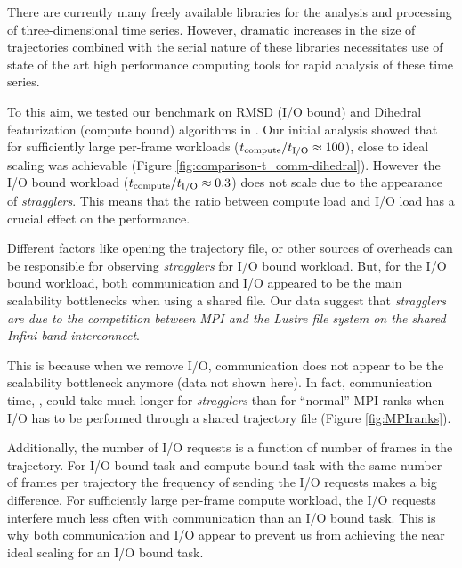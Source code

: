\label{concl} 
There are currently many freely available libraries for the analysis and processing of three-dimensional time series.
However, dramatic increases in the size of trajectories combined with the serial nature of these libraries necessitates 
use of state of the art high performance computing tools for rapid analysis of these time series. 

To this aim, we tested our benchmark on RMSD (I/O bound) and Dihedral featurization (compute bound) algorithms in .
Our initial analysis showed that for sufficiently large per-frame workloads (${t}_{\text{compute}}/{t}_{\text{I/O}} \approx 100$), close to ideal scaling was achievable (Figure \ref{fig:comparison-t_comm-dihedral}).
However the I/O bound workload (${t}_{\text{compute}}/{t}_{\text{I/O}} \approx 0.3$) does not scale due to the appearance of \emph{stragglers}. 
This means that the ratio between compute load and I/O load has a crucial effect on the performance. 

Different factors like opening the trajectory file, or other sources of overheads can be responsible for observing \emph{stragglers} for I/O bound workload.
But, for the I/O bound workload, both communication and I/O appeared to be the main scalability bottlenecks when using a shared file.
Our data suggest that \emph{stragglers are due to the competition between MPI and the Lustre file system on the shared Infini-band interconnect}. 

This is because when we remove I/O, communication does not appear to be the scalability bottleneck anymore (data not shown here).
In fact, communication time, \tcomm, could take
much longer for \emph{stragglers} than for ``normal'' MPI ranks when I/O has to be performed through a shared trajectory file (Figure \ref{fig:MPIranks}). 

Additionally, the number of I/O requests is a function of number of frames in the trajectory. 
For I/O bound task and compute bound task with the same number of frames per trajectory the frequency of sending the I/O requests makes a big difference.
For sufficiently large per-frame compute workload, the I/O requests interfere much less often with communication than an I/O bound task.
This is why both communication and I/O appear to prevent us from achieving the near ideal scaling for an I/O bound task.

